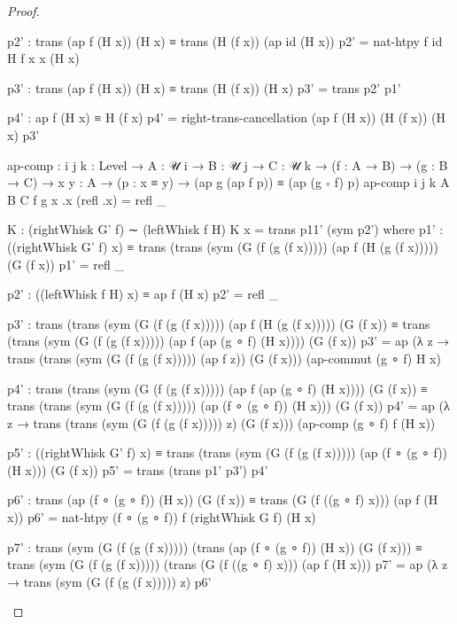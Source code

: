 \documentclass{article}[12pt]
\begin{document}
\begin{proof}
\begin{code}
                p2' : trans (ap f (H x)) (H x) ≡ trans (H (f x)) (ap id (H x))
                p2' = nat-htpy f id H {f x} {x} (H x)

                p3' : trans (ap f (H x)) (H x) ≡ trans (H (f x)) (H x)
                p3' = trans p2' p1'

                p4' : ap f (H x) ≡ H (f x)
                p4' = right-trans-cancellation (ap f (H x)) (H (f x)) (H x) p3'

        ap-comp : {i j k : Level} → {A : 𝒰 i} → {B : 𝒰 j} → {C : 𝒰 k}
                  → (f : A → B)
                  → (g : B → C)
                  → {x y : A}
                  → (p : x ≡ y)
                  → (ap g (ap f p)) ≡ (ap (g ∘ f) p)
        ap-comp {i} {j} {k} {A} {B} {C} f g {x} {.x} (refl .x) = refl _

        K : (rightWhisk G' f) ∼ (leftWhisk f H)
        K x = trans p11' (sym p2')
            where
                p1' : ((rightWhisk G' f) x) 
                    ≡ trans (trans (sym (G (f (g (f x))))) (ap f (H (g (f x))))) (G (f x))
                p1' = refl _

                p2' : ((leftWhisk f H) x) ≡ ap f (H x)
                p2' = refl _

                p3' : trans (trans (sym (G (f (g (f x))))) (ap f (H (g (f x))))) (G (f x)) 
                    ≡ trans (trans (sym (G (f (g (f x))))) (ap f (ap (g ∘ f) (H x)))) (G (f x))
                p3' = ap 
                    (λ z → trans (trans (sym (G (f (g (f x))))) (ap f z)) (G (f x))) 
                        (ap-commut (g ∘ f) H x)

                p4' : trans (trans (sym (G (f (g (f x))))) (ap f (ap (g ∘ f) (H x)))) (G (f x))
                    ≡ trans (trans (sym (G (f (g (f x))))) (ap (f ∘ (g ∘ f)) (H x))) (G (f x))
                p4' = ap 
                    (λ z → trans (trans (sym (G (f (g (f x))))) z) (G (f x))) 
                        (ap-comp (g ∘ f) f (H x))
                
                p5' : ((rightWhisk G' f) x) 
                    ≡ trans (trans (sym (G (f (g (f x))))) (ap (f ∘ (g ∘ f)) (H x))) (G (f x))
                p5' = trans (trans p1' p3') p4'

                p6' : trans (ap (f ∘ (g ∘ f)) (H x)) (G (f x)) 
                    ≡ trans (G (f ((g ∘ f) x))) (ap f (H x))
                p6' = nat-htpy (f ∘ (g ∘ f)) f (rightWhisk G f) (H x)

                p7' : trans (sym (G (f (g (f x))))) (trans (ap (f ∘ (g ∘ f)) (H x)) (G (f x))) 
                    ≡ trans (sym (G (f (g (f x))))) (trans (G (f ((g ∘ f) x))) (ap f (H x)))
                p7' = ap (λ z → trans (sym (G (f (g (f x))))) z) p6'


\end{code}
\end{proof}
\end{document}
